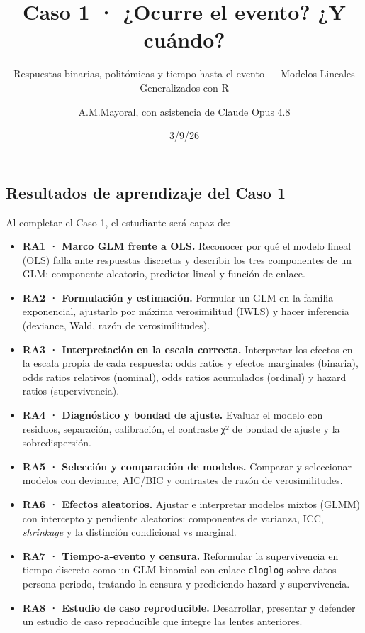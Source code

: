 \documentclass[
  letterpaper,
  DIV=11,
  numbers=noendperiod]{scrartcl}
\title{Caso 1 · ¿Ocurre el evento? ¿Y cuándo?}
\subtitle{Respuestas binarias, politómicas y tiempo hasta el evento ---
Modelos Lineales Generalizados con R}
\author{A.M.Mayoral, con asistencia de Claude Opus 4.8}
\date{3/9/26}
\providecommand{\tightlist}{%
  \setlength{\itemsep}{0pt}\setlength{\parskip}{0pt}}\usepackage{longtable,booktabs,array}
\renewcommand*\contentsname{Tabla de contenidos}
\newcommand\contentsname{Tabla de contenidos}
\begin{document}
\maketitle
\ifdefined\Shaded\renewenvironment{Shaded}{\begin{tcolorbox}[breakable, interior hidden, enhanced, sharp corners, borderline west={3pt}{0pt}{shadecolor}, frame hidden, boxrule=0pt]}{\end{tcolorbox}}\fi

\renewcommand*\contentsname{Tabla de contenidos}
{
\hypersetup{linkcolor=}
\setcounter{tocdepth}{3}
\tableofcontents
}
\hypertarget{sec-ra}{%
\subsection{Resultados de aprendizaje del Caso 1}\label{sec-ra}}

Al completar el Caso 1, el estudiante será capaz de:

\begin{itemize}
\tightlist
\item
  \textbf{RA1 · Marco GLM frente a OLS.} Reconocer por qué el modelo
  lineal (OLS) falla ante respuestas discretas y describir los tres
  componentes de un GLM: componente aleatorio, predictor lineal y
  función de enlace.
\item
  \textbf{RA2 · Formulación y estimación.} Formular un GLM en la familia
  exponencial, ajustarlo por máxima verosimilitud (IWLS) y hacer
  inferencia (deviance, Wald, razón de verosimilitudes).
\item
  \textbf{RA3 · Interpretación en la escala correcta.} Interpretar los
  efectos en la escala propia de cada respuesta: odds ratios y efectos
  marginales (binaria), odds ratios relativos (nominal), odds ratios
  acumulados (ordinal) y hazard ratios (supervivencia).
\item
  \textbf{RA4 · Diagnóstico y bondad de ajuste.} Evaluar el modelo con
  residuos, separación, calibración, el contraste χ² de bondad de ajuste
  y la sobredispersión.
\item
  \textbf{RA5 · Selección y comparación de modelos.} Comparar y
  seleccionar modelos con deviance, AIC/BIC y contrastes de razón de
  verosimilitudes.
\item
  \textbf{RA6 · Efectos aleatorios.} Ajustar e interpretar modelos
  mixtos (GLMM) con intercepto y pendiente aleatorios: componentes de
  varianza, ICC, \emph{shrinkage} y la distinción condicional vs
  marginal.
\item
  \textbf{RA7 · Tiempo-a-evento y censura.} Reformular la supervivencia
  en tiempo discreto como un GLM binomial con enlace \texttt{cloglog}
  sobre datos persona-periodo, tratando la censura y prediciendo hazard
  y supervivencia.
\item
  \textbf{RA8 · Estudio de caso reproducible.} Desarrollar, presentar y
  defender un estudio de caso reproducible que integre las lentes
  anteriores.
\end{itemize}
\end{document}
